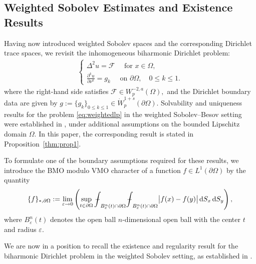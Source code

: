 \documentclass[12pt,a4paper,twoside]{article}
\newcommand{\diff}{\operatorname{d}\!}
\newcommand{\meanint}{{\int{\mkern-19mu}-}}
\begin{document}
\subsection{Weighted Sobolev Estimates and Existence Results} \label{eq:weightedsobolev}
Having now introduced weighted Sobolev spaces and the corresponding Dirichlet trace spaces, we revisit the inhomogeneous biharmonic Dirichlet problem:
\begin{align}
    \begin{cases}
 \Delta^2 u= \mathcal{F} \quad \text{ for } x \in \Omega, \\
    \displaystyle\frac{\partial^k u}{\partial \nu^k} = g_k \quad \text{ on } \partial \Omega, \quad 0\le k\le 1.
    \end{cases} \label{eq:weightedlp} %
\end{align}
where the right-hand side satisfies $\mathcal {F} \in W^{-2, a}_p(\Omega),$ and the Dirichlet boundary data are given by $ g:=\{g_k\}_{0\le k\le 1}\in \dot W^{1+s}_p(\partial \Omega)$. 
Solvability and uniqueness results for the problem \eqref{eq:weightedlp} in the weighted Sobolev–Besov setting were established in \cite[p. 169 Theorem 1.1]{maz2010dirichlet}, under additional assumptions on the bounded Lipschitz domain  $\Omega$. In this paper, the corresponding result is stated in Proposition~\ref{thm:prop1}.  

To formulate one of the boundary assumptions required for these results, we introduce the BMO modulo VMO character of a function $f\in L^1(\partial\Omega)$ by the quantity
\begin{align*}
    \{ f\}_{\ast,\partial\Omega}:=\lim_{\varepsilon\to 0}\left(\sup_{t\in\partial\Omega} \meanint_{B_\varepsilon^n(t) \cap \partial\Omega} 
    \meanint_{B_\varepsilon^n(t) \cap \partial\Omega} \big| f(x)-f(y) \big| \diff S_x \diff S_y \right),
\end{align*}
where $B_\varepsilon^n(t)$ denotes the open ball  $n$-dimensional open ball with the center $t$ and radius $\varepsilon$. 

We are now in a position to recall the existence and regularity result for the biharmonic Dirichlet problem in the weighted Sobolev setting, as established in \cite{maz2010dirichlet}.
\end{document}
